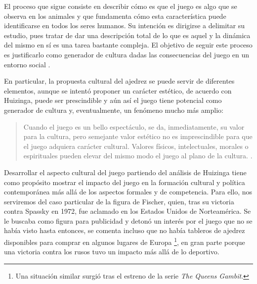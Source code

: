 \documentclass[twoside,openright,12pt,a4paper,spanish]{book}
\begin{document}
El proceso que sigue consiste en describir c\'omo es que el juego es algo que se observa en los animales y que fundamenta c\'omo esta caracter\'istica puede identificarse en todos los seres humanos. Su intenci\'on es dirigirse a delimitar su estudio, pues tratar de dar una descripci\'on total de lo que es aquel y la din\'amica del mismo en s\'i es una tarea bastante compleja. El objetivo de seguir este proceso es justificarlo como generador de cultura dadas las consecuencias del juego en un entorno social \cite[p. 19]{huizinga2020homo}.

En particular, la propuesta cultural del ajedrez se puede servir de diferentes elementos, aunque se intent\'o proponer un car\'acter est\'etico, de acuerdo con Huizinga, puede ser prescindible y a\'un as\'i el juego tiene potencial como generador de cultura y, eventualmente, un fen\'omeno mucho m\'as amplio:

\begin{quote}\singlespacing Cuando el juego es un bello espect\'aculo, se da, inmediatamente, su valor para la cultura, pero semejante valor est\'etico no es imprescindible para que el juego adquiera car\'acter cultural. Valores f\'isicos, intelectuales, morales o espirituales pueden elevar del mismo modo el juego al plano de la cultura.  \cite[p. 70]{huizinga2020homo}.
\end{quote}

Desarrollar el aspecto cultural del juego partiendo del análisis de Huizinga tiene como propósito mostrar el impacto del juego en la formación cultural y política contemporánea más allá de los aspectos formales y de competencia. Para ello, nos serviremos del caso particular de la figura de Fischer, quien, tras su victoria contra Spassky en 1972, fue aclamado en los Estados Unidos de Norteam\'erica. Se le buscaba como figura para publicidad y deton\'o un inter\'es por el juego que no se hab\'ia visto hasta entonces, se comenta incluso que no hab\'ia tableros de ajedrez disponibles para comprar en algunos lugares de Europa \cite[p. 222]{golombek1976history}\footnote{Una situaci\'on similar surgi\'o tras el estreno de la serie \textit{The Queens Gambit}.}, en gran parte porque una victoria contra los rusos tuvo un impacto m\'as all\'a de lo deportivo.
\end{document}
